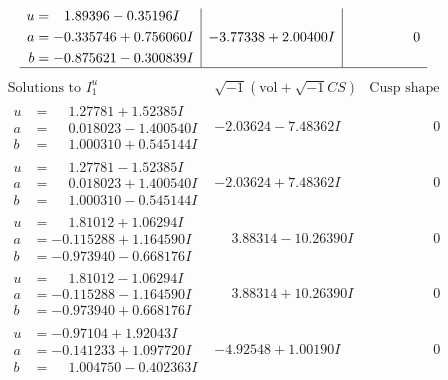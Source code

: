 \documentclass[1p]{elsarticle_modified}
\theoremstyle{definition}
\newcommand{\I}{\sqrt{-1}}
\begin{document}
$$\begin{array}{c|c|c}
\begin{aligned}
u &= \phantom{-}1.89396 - 0.35196 I \\
a &= -0.335746 + 0.756060 I \\
b &= -0.875621 - 0.300839 I\end{aligned}
 & -3.77338 + 2.00400 I & \phantom{-0.000000 } 0\\
 \hline 
 \end{array}$$\newpage$$\begin{array}{c|c|c}  
\text{Solutions to }I^u_{1}& \I (\text{vol} + \sqrt{-1}CS) & \text{Cusp shape}\\
 \hline 
\begin{aligned}
u &= \phantom{-}1.27781 + 1.52385 I \\
a &= \phantom{-}0.018023 - 1.400540 I \\
b &= \phantom{-}1.000310 + 0.545144 I\end{aligned}
 & -2.03624 - 7.48362 I & \phantom{-0.000000 } 0 \\ \hline\begin{aligned}
u &= \phantom{-}1.27781 - 1.52385 I \\
a &= \phantom{-}0.018023 + 1.400540 I \\
b &= \phantom{-}1.000310 - 0.545144 I\end{aligned}
 & -2.03624 + 7.48362 I & \phantom{-0.000000 } 0 \\ \hline\begin{aligned}
u &= \phantom{-}1.81012 + 1.06294 I \\
a &= -0.115288 + 1.164590 I \\
b &= -0.973940 - 0.668176 I\end{aligned}
 & \phantom{-}3.88314 - 10.26390 I & \phantom{-0.000000 } 0 \\ \hline\begin{aligned}
u &= \phantom{-}1.81012 - 1.06294 I \\
a &= -0.115288 - 1.164590 I \\
b &= -0.973940 + 0.668176 I\end{aligned}
 & \phantom{-}3.88314 + 10.26390 I & \phantom{-0.000000 } 0 \\ \hline\begin{aligned}
u &= -0.97104 + 1.92043 I \\
a &= -0.141233 + 1.097720 I \\
b &= \phantom{-}1.004750 - 0.402363 I\end{aligned}
 & -4.92548 + 1.00190 I & \phantom{-0.000000 } 0 \\ \hline\begin{aligned}

\end{aligned}
\end{array}$$
\end{document}
